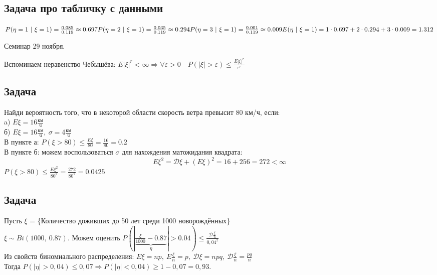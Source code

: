 \documentclass[12pt, a4paper]{article}
\begin{document}
    \subsection*{Задача про табличку с данными}
    $P(\eta = 1\ |\ \xi = 1) = \frac{0.085}{0.119} \approx 0.697\\
    P(\eta = 2\ |\ \xi = 1) = \frac{0.035}{0.119} \approx 0.294
    P(\eta = 3\ |\ \xi = 1) = \frac{0.001}{0.119} \approx 0.009\\
    E(\eta\ |\ \xi = 1) = 1\cdot 0.697 + 2\cdot 0.294 + 3\cdot 0.009 = 1.312$
    \begin{center}
        Семинар 29 ноября.
    \end{center}

    Вспоминаем неравенство Чебышёва:
    $E|\xi|^r < \infty\Rightarrow \forall \varepsilon > 0\quad P(|\xi| > \varepsilon) \leq \frac{E|\xi|^r}{\varepsilon^r}$\\
    \subsection*{Задача}
    Найди вероятность того, что в некоторой области скорость ветра превысит 80 км/ч, если:\\
    a) $E\xi = 16 \frac{\text{км}}{\text{ч}}$\\
    б) $E\xi = 16\frac{\text{км}}{\text{ч}},\ \sigma = 4 \frac{\text{км}}{\text{ч}}$\\
    В пункте а: $P(\xi > 80) \leq \frac{E\xi}{80} = \frac{16}{80} = 0.2$\\
    В пункте б: можем воспользоваться $\sigma$ для нахождения матожидания квадрата:
    \[E\xi^2 = \mathcal{D}\xi + (E\xi)^2 = 16 + 256 = 272 < \infty\]
    $P(\xi > 80) \leq \frac{E\xi^2}{80^2} = \frac{272}{80^2} = 0.0425$
    \subsection*{Задача}
    Пусть $\xi$ = \{Количество доживших до 50 лет среди 1000 новорождённых\}\\
    $\xi \sim Bi(1000,\ 0.87)$. Можем оценить $P(|\underset{\eta}{\underbrace{\frac{\xi}{1000} - 0.87}}| > 0.04) \leq \frac{\mathcal{D}\frac{\xi}{n}}{0,04^2}$\\
    Из свойств биномиального распределения: $E\xi = np,\ E\frac{\xi}{n} = p,\ \mathcal{D}\xi = npq,\ \mathcal{D}\frac{\xi}{n} = \frac{pq}{n}$\\
    Тогда $P(|\eta| > 0,04) \leq 0,07\Rightarrow P(|\eta| < 0,04) \geq 1 - 0,07 = 0,93$.
\end{document}
